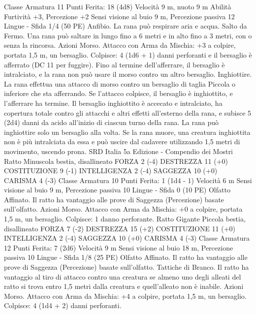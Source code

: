 \begin{multicols}{2}
Classe Armatura 11
\hspace*{0pt}\hfill{Punti Ferita}: 18 (4d8)
Velocità 9 m, nuoto 9 m
Abilità Furtività +3, Percezione +2
Sensi visione al buio 9 m, Percezione passiva 12
Lingue -
Sfida 1/4 (50 PE)
Anfibio. La rana può respirare aria e acqua.
Salto da Fermo. Una rana può saltare in lungo fino a 6 metri e in
alto fino a 3 metri, con o senza la rincorsa.
Azioni
Morso. Attacco con Arma da Mischia: +3 a colpire, portata 1,5
m, un bersaglio.
Colpisce: 4 (1d6 + 1) danni perforanti e il bersaglio è afferrato
(DC 11 per fuggire). Fino al termine dell’afferrare, il bersaglio è
intralciato, e la rana non può usare il morso contro un altro
bersaglio.
Inghiottire. La rana effettua una attacco di morso contro un
bersaglio di taglia Piccola o inferiore che sta afferrando. Se
l’attacco colpisce, il bersaglio è inghiottito, e l’afferrare ha
termine. Il bersaglio inghiottito è accecato e intralciato, ha
copertura totale contro gli attacchi e altri effetti all’esterno della
rana, e subisce 5 (2d4) danni da acido all’inizio di ciascun turno
della rana. La rana può inghiottire solo un bersaglio alla volta.
Se la rana muore, una creatura inghiottita non è più intralciata da
essa e può uscire dal cadavere utilizzando 1,5 metri di
movimento, uscendo prona.
SRD Italia 5a Edizione - Compendio dei Mostri
Ratto
Minuscola bestia, disallineato
FORZA 2 (-4)
DESTREZZA 11 (+0)
COSTITUZIONE 9 (-1)
INTELLIGENZA 2 (-4)
SAGGEZZA 10 (+0)
CARISMA 4 (-3)
Classe Armatura 10
\hspace*{0pt}\hfill{Punti Ferita}: 1 (1d4 - 1)
Velocità 6 m
Sensi visione al buio 9 m, Percezione passiva 10
Lingue -
Sfida 0 (10 PE)
Olfatto Affinato. Il ratto ha vantaggio alle prove di Saggezza
(Percezione) basate sull’olfatto.
Azioni
Morso. Attacco con Arma da Mischia: +0 a colpire, portata 1,5
m, un bersaglio.
Colpisce: 1 danno perforante.
Ratto Gigante
Piccola bestia, disallineato
FORZA 7 (-2)
DESTREZZA 15 (+2)
COSTITUZIONE 11 (+0)
INTELLIGENZA 2 (-4)
SAGGEZZA 10 (+0)
CARISMA 4 (-3)
Classe Armatura 12
\hspace*{0pt}\hfill{Punti Ferita}: 7 (2d6)
Velocità 9 m
Sensi visione al buio 18 m, Percezione passiva 10
Lingue -
Sfida 1/8 (25 PE)
Olfatto Affinato. Il ratto ha vantaggio alle prove di Saggezza
(Percezione) basate sull’olfatto.
Tattiche di Branco. Il ratto ha vantaggio al tiro di attacco contro
una creatura se almeno uno degli alleati del ratto si trova entro
1,5 metri dalla creatura e quell’alleato non è inabile.
Azioni
Morso. Attacco con Arma da Mischia: +4 a colpire, portata 1,5
m, un bersaglio.
Colpisce: 4 (1d4 + 2) danni perforanti.

\end{multicols}
